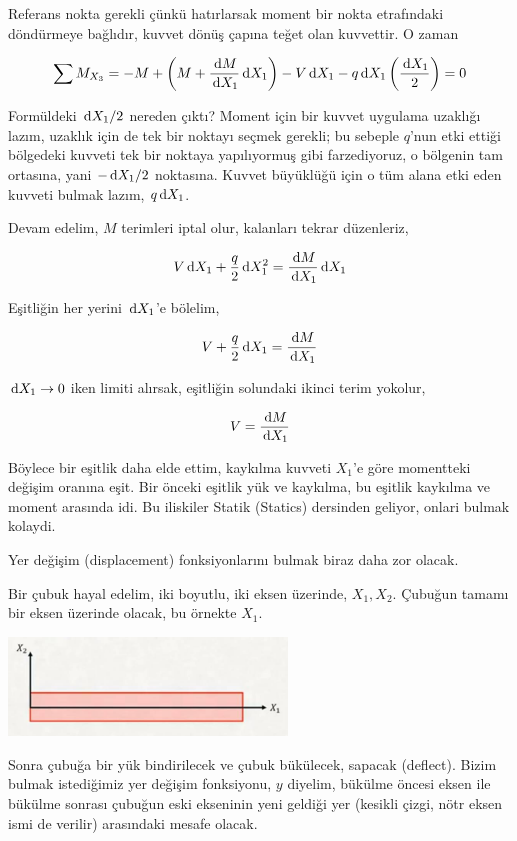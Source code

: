 \documentclass[12pt,fleqn]{article}\usepackage{../../common}
\begin{document}
Referans nokta gerekli çünkü hatırlarsak moment bir nokta etrafındaki
döndürmeye bağlıdır, kuvvet dönüş çapına teğet olan kuvvettir. O zaman 

$$
\sum M_{X_3} = -M + \left( M + \frac{\,\mathrm{d} M}{\,\mathrm{d} X_1} \,\mathrm{d} X_1 \right) -
V \,\mathrm{d} X_1 - q \,\mathrm{d} X_1 \left( \frac{\,\mathrm{d} X_1}{2}  \right) = 0
$$

Formüldeki $\,\mathrm{d} X_1 / 2$ nereden çıktı? Moment için bir kuvvet uygulama uzaklığı
lazım, uzaklık için de tek bir noktayı seçmek gerekli; bu sebeple $q$'nun etki
ettiği bölgedeki kuvveti tek bir noktaya yapılıyormuş gibi farzediyoruz, o
bölgenin tam ortasına, yani $- \,\mathrm{d} X_1 / 2$ noktasına.  Kuvvet büyüklüğü için o
tüm alana etki eden kuvveti bulmak lazım, $q \,\mathrm{d} X_1$.

Devam edelim, $M$ terimleri iptal olur, kalanları tekrar düzenleriz,

$$
V \,\mathrm{d} X_1 + \frac{q}{2} \,\mathrm{d} X_1^2 = \frac{\,\mathrm{d} M}{\,\mathrm{d} X_1} \,\mathrm{d} X_1
$$

Eşitliğin her yerini $\,\mathrm{d} X_1$'e bölelim,

$$
V + \frac{q}{2} \,\mathrm{d} X_1 = \frac{\,\mathrm{d} M}{\,\mathrm{d} X_1} 
$$

$\,\mathrm{d} X_1 \to 0$ iken limiti alırsak, eşitliğin solundaki ikinci terim yokolur,

$$
V = \frac{\,\mathrm{d} M}{\,\mathrm{d} X_1} 
$$

Böylece bir eşitlik daha elde ettim, kaykılma kuvveti $X_1$'e göre momentteki
değişim oranına eşit. Bir önceki eşitlik yük ve kaykılma, bu eşitlik kaykılma ve
moment arasında idi. Bu iliskiler Statik (Statics) dersinden geliyor, onlari
bulmak kolaydi.

Yer değişim (displacement) fonksiyonlarını bulmak biraz daha zor olacak. 

Bir çubuk hayal edelim, iki boyutlu, iki eksen üzerinde, $X_1,X_2$.
Çubuğun tamamı bir eksen üzerinde olacak, bu örnekte $X_1$.

\includegraphics[width=20em]{phy_020_strs_02_12.jpg}

Sonra çubuğa bir yük bindirilecek ve çubuk bükülecek, sapacak (deflect).  Bizim
bulmak istediğimiz yer değişim fonksiyonu, $y$ diyelim, bükülme öncesi eksen ile
bükülme sonrası çubuğun eski ekseninin yeni geldiği yer (kesikli çizgi, nötr
eksen ismi de verilir) arasındaki mesafe olacak.
\end{document}
